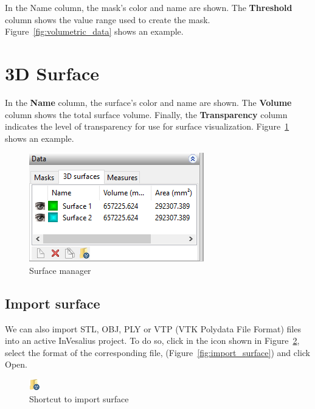 In the Name column, the mask’s color and name are shown. The \textbf{Threshold} column shows the value range used to create the mask. Figure~\ref{fig:volumetric_data} shows an example.

\section{3D Surface}

In the \textbf{Name} column, the surface’s color and name are shown. The \textbf{Volume} column shows the total surface volume. Finally, the \textbf{Transparency} column indicates the level of transparency for use for surface visualization. Figure~\ref{fig:surface_manager} shows an example.

\begin{figure}[!htb]
\centering
\includegraphics[scale=0.7]{../user_guide_figures/invesalius_screen/painel_volumetric_measures_en.png}
\caption{Surface manager}
\label{fig:surface_manager}
\end{figure}

\subsection{Import surface}

We can also import STL, OBJ, PLY or VTP (VTK Polydata File Format) files into an active InVesalius project. To do so, click in the icon shown in Figure~\ref{fig:import_stl}, select the format of the corresponding file, (Figure~\ref{fig:import_surface}) and click Open.

\begin{figure}[!htb]
\centering
\includegraphics[scale=0.8]{../user_guide_figures/icons/load_mesh.png}
\caption{Shortcut to import surface }
\label{fig:import_stl}
\end{figure}

